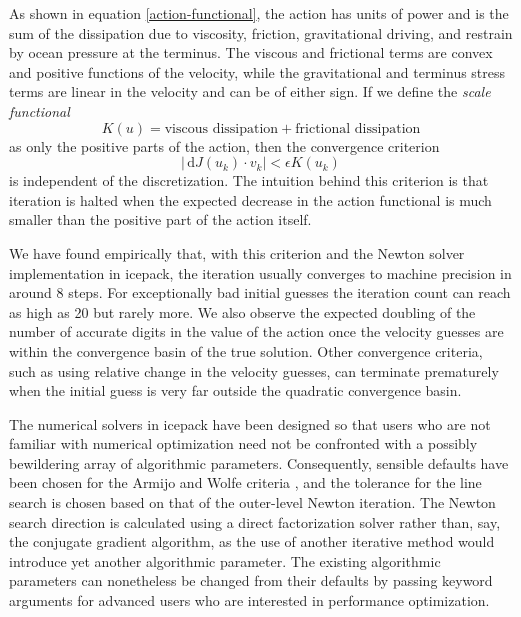 \documentclass{article}
\theoremstyle{definition}
\theoremstyle{plain}
\newcommand{\ud}{\hspace{2pt}\mathrm{d}}
\begin{document}
As shown in equation \eqref{action-functional}, the action has units of power and is the sum of the dissipation due to viscosity, friction, gravitational driving, and restrain by ocean pressure at the terminus.
The viscous and frictional terms are convex and positive functions of the velocity, while the gravitational and terminus stress terms are linear in the velocity and can be of either sign.
If we define the \emph{scale functional}
\begin{equation}
    K(u) = \text{viscous dissipation} + \text{frictional dissipation}
\end{equation}
as only the positive parts of the action, then the convergence criterion
\begin{equation}
    |\ud J(u_k)\cdot v_k| < \epsilon K(u_k)
\end{equation}
is independent of the discretization.
The intuition behind this criterion is that iteration is halted when the expected decrease in the action functional is much smaller than the positive part of the action itself.

We have found empirically that, with this criterion and the Newton solver implementation in icepack, the iteration usually converges to machine precision in around 8 steps.
For exceptionally bad initial guesses the iteration count can reach as high as 20 but rarely more.
We also observe the expected doubling of the number of accurate digits in the value of the action once the velocity guesses are within the convergence basin of the true solution.
Other convergence criteria, such as using relative change in the velocity guesses, can terminate prematurely when the initial guess is very far outside the quadratic convergence basin.

The numerical solvers in icepack have been designed so that users who are not familiar with numerical optimization need not be confronted with a possibly bewildering array of algorithmic parameters.
Consequently, sensible defaults have been chosen for the Armijo and Wolfe criteria \citep{nocedal2006numerical}, and the tolerance for the line search is chosen based on that of the outer-level Newton iteration.
The Newton search direction is calculated using a direct factorization solver rather than, say, the conjugate gradient algorithm, as the use of another iterative method would introduce yet another algorithmic parameter.
The existing algorithmic parameters can nonetheless be changed from their defaults by passing keyword arguments for advanced users who are interested in performance optimization.
\end{document}
